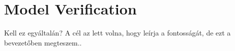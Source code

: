 \section{Model Verification}



Kell ez egyáltalán? A cél az lett volna, hogy leírja a fontosságát, de ezt a bevezetőben megteszem..

